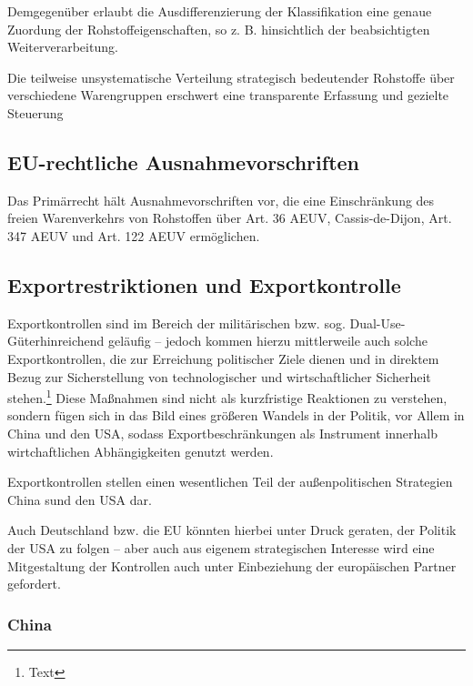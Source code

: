 \documentclass[12pt,a4paper,oneside]{book} %
\begin{document}
Demgegenüber erlaubt die Ausdifferenzierung der Klassifikation eine genaue Zuordung der Rohstoffeigenschaften, so z. B. hinsichtlich der beabsichtigten Weiterverarbeitung.\autocite{Schorkopf, Rohstoffverwaltung, Rn. 8.}

Die teilweise unsystematische Verteilung strategisch bedeutender Rohstoffe über verschiedene Warengruppen erschwert eine transparente Erfassung und gezielte Steuerung

\subsection{EU-rechtliche Ausnahmevorschriften}

Das Primärrecht hält Ausnahmevorschriften vor, die eine Einschränkung des freien Warenverkehrs von Rohstoffen über Art. 36 AEUV, Cassis-de-Dijon, Art. 347 AEUV und Art. 122 AEUV ermöglichen.\autocite{Schorkopf, Rohstoffverwaltung, Rn. 10}


\subsection{Exportrestriktionen und Exportkontrolle}



Exportkontrollen sind im Bereich der militärischen bzw. sog. \glqq Dual-Use-Güter\grqq hinreichend geläufig -- jedoch kommen hierzu mittlerweile auch solche Exportkontrollen, die zur Erreichung politischer Ziele dienen und in direktem Bezug zur Sicherstellung von technologischer und wirtschaftlicher Sicherheit stehen.\footnote{Text} Diese Maßnahmen sind nicht als kurzfristige Reaktionen zu verstehen, sondern fügen sich in das Bild eines größeren Wandels in der Politik, vor Allem in China und den USA, sodass Exportbeschränkungen als Instrument innerhalb wirtchaftlichen Abhängigkeiten genutzt werden.

Exportkontrollen stellen einen wesentlichen Teil der außenpolitischen Strategien China sund den USA dar.

Auch Deutschland bzw. die EU könnten hierbei unter Druck geraten, der Politik der USA zu folgen -- aber auch aus eigenem strategischen Interesse wird eine Mitgestaltung der Kontrollen auch unter Einbeziehung der europäischen Partner gefordert.\autocite{Medunic, FiliP. Deutschland muss Exportkontrollen strategischer gestalten, DGAp Memo Nr. 15, Juli 2024, S.1.}


\subsubsection{China}
\end{document}
